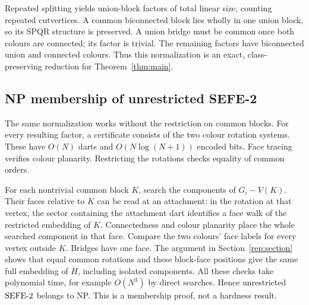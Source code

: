 Repeated splitting yields union-block factors of total linear size,
counting repeated cutvertices. A common biconnected block lies wholly
in one union block, so its SPQR structure is preserved. A union bridge
must be common once both colours are connected; its factor is trivial.
The remaining factors have biconnected union and connected colours.
Thus this normalization is an exact, class-preserving reduction for
Theorem~\ref{thm:main}.

\subsection{NP membership of unrestricted SEFE-2}

The same normalization works without the restriction on common blocks.
For every resulting factor, a certificate consists of the two colour
rotation systems. These have $O(N)$ darts and $O(N\log(N+1))$ encoded
bits. Face tracing verifies colour planarity. Restricting the rotations
checks equality of common orders.

For each nontrivial common block $K$, search the components of $G_i-V(K)$.
Their faces relative to $K$ can be read at an attachment: in the rotation
at that vertex, the sector containing the attachment dart identifies a
face walk of the restricted embedding of $K$. Connectedness and colour
planarity place the whole searched component in that face. Compare the
two colours' face labels for every vertex outside $K$. Bridges have one
face. The argument in Section~\ref{rep:section} shows that equal common
rotations and these block-face positions give the same full embedding
of $H$, including isolated components. All these checks take polynomial
time, for example $O(N^3)$ by direct searches. Hence unrestricted
$\mathrm{SEFE\text{-}2}$ belongs to NP. This is a membership proof, not a hardness result.
